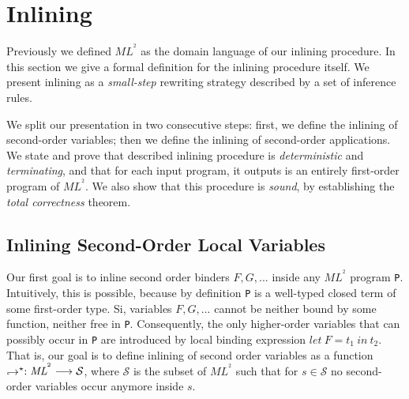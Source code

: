 \documentclass[a4paper,11pt,oneside]{article}
\theoremstyle{plain}
\newcommand{\tmlet}[3]{let~#1=#2~in~#3}
\newcommand{\bwedge}{\boldsymbol{~\wedge~}}
\newcommand{\inlS}{\mathcal{S}}
\newcommand{\inlsrc}{\textit{ML}^{^2}}
\newcommand{\hookdownarrow}{\mathrel{\rotatebox[origin=c]{180}{$\hookleftarrow$}}}
\newcommand{\inlletstar}{\hookdownarrow^{\star}}
\begin{document}
\section{Inlining}
\label{sec:Inlining}

 Previously we defined $\inlsrc$ as the domain language of our inlining procedure. 
 In this section we give a formal definition for the inlining procedure itself.
 We present inlining as a \textit{small-step} rewriting strategy described by a set of inference rules.
 
 We split our presentation in two consecutive steps: first, we define the inlining of second-order variables; then we define the inlining of second-order applications.
 We state and prove that described inlining procedure is \textit{deterministic} and \textit{terminating}, and that for each input program, it outputs is an entirely first-order program of $\inlsrc$. We also show that this procedure is \textit{sound}, by establishing the \textit{total correctness} theorem.\\

	
%


\subsection{Inlining Second-Order Local Variables}
	Our first goal is to inline second order binders $F,G,...$ inside any $\inlsrc$ program \texttt{P}. 
	Intuitively, this is possible, because by definition \texttt{P} is a well-typed closed term of some first-order type.
	Si, variables $F,G,...$ cannot be neither bound by some function, neither free in \texttt{P}. 
	Consequently, the only higher-order variables that can possibly occur in \texttt{P} are introduced by local binding expression $\tmlet{F}{t_1}{t_2}$.
	That is, our goal is to define inlining of second order variables as a function  $\inlletstar : \inlsrc \longrightarrow \inlS$, where $\inlS$ is the subset of $\inlsrc$ such that for $s \in \inlS$ no second-order variables occur anymore inside $s$. \\
	 
\end{document}
